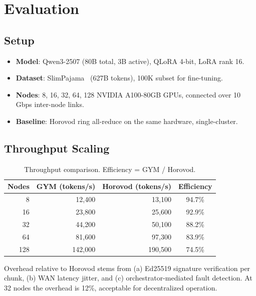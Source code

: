 \documentclass[11pt,letterpaper]{article}
\begin{document}
\section{Evaluation}
\label{sec:evaluation}

\subsection{Setup}

\begin{itemize}
    \item \textbf{Model}: Qwen3-2507 (80B total, 3B active), QLoRA 4-bit, LoRA rank 16.
    \item \textbf{Dataset}: SlimPajama~\cite{cerebras2023slimpajama} (627B tokens), 100K subset for fine-tuning.
    \item \textbf{Nodes}: 8, 16, 32, 64, 128 NVIDIA A100-80GB GPUs, connected over 10 Gbps inter-node links.
    \item \textbf{Baseline}: Horovod ring all-reduce on the same hardware, single-cluster.
\end{itemize}

\subsection{Throughput Scaling}

\begin{table}[t]
\centering
\begin{tabular}{rrrc}
\toprule
\textbf{Nodes} & \textbf{GYM (tokens/s)} & \textbf{Horovod (tokens/s)} & \textbf{Efficiency} \\
\midrule
8 & 12{,}400 & 13{,}100 & 94.7\% \\
16 & 23{,}800 & 25{,}600 & 92.9\% \\
32 & 44{,}200 & 50{,}100 & 88.2\% \\
64 & 81{,}600 & 97{,}300 & 83.9\% \\
128 & 142{,}000 & 190{,}500 & 74.5\% \\
\bottomrule
\end{tabular}
\caption{Throughput comparison. Efficiency = GYM / Horovod.}
\label{tab:throughput}
\end{table}

Overhead relative to Horovod stems from (a) Ed25519 signature verification per chunk, (b) WAN latency jitter, and (c) orchestrator-mediated fault detection.  At 32 nodes the overhead is 12\%, acceptable for decentralized operation.
\end{document}
